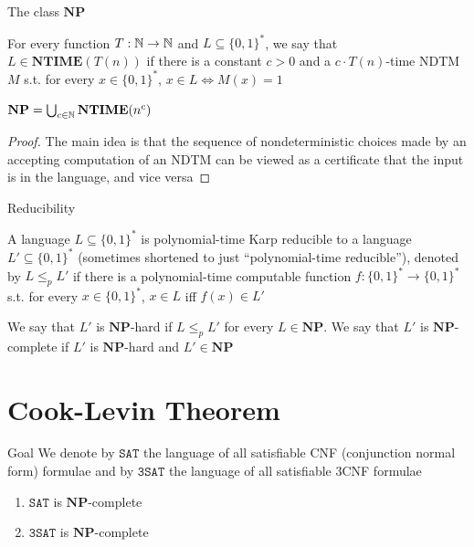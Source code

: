 \documentclass[presentation]{beamer}
\def \NTIME {\textbf{NTIME}}
\def \NP {\textbf{NP}}
\def \NP {\textbf{NP}}
\def \SAT {\texttt{SAT}}
\def \TSAT {\texttt{3SAT}}
\begin{document}
\begin{frame}[label={sec:orgbb9d0bb}]{The class \texorpdfstring{\(\NP\)}{NP}}
\begin{definition}[]
For every function \(T:\mathbb{N}\to\mathbb{N}\) and \(L\subseteq\{0,1\}^*\), we say that \(L\in\NTIME(T(n))\) if there is a
constant \(c>0\) and a \(c\cdot T(n)\)-time NDTM \(M\) s.t. for
every \(x\in\{0,1\}^*\), \(x\in L\Leftrightarrow M(x)=1\)
\end{definition}

\begin{theorem}[]
\(\NP=\bigcup_{c\in\N}\NTIME(n^c)\)
\end{theorem}

\begin{proof}
The main idea is that the sequence of nondeterministic choices made by an accepting computation
of an NDTM  can be viewed as a certificate that the input is in the language, and vice versa
\end{proof}
\end{frame}

\begin{frame}[label={sec:org9508fec}]{Reducibility}
\begin{definition}[]
A language \(L\subseteq\{0,1\}^*\) is \alert{polynomial-time Karp reducible to a
language} \(L'\subseteq\{0,1\}^*\) (sometimes shortened to just ``polynomial-time reducible''), denoted
by \(L\le_p L'\) if there is a polynomial-time
computable function \(f:\{0,1\}^*\to\{0,1\}^*\) s.t. for every \(x\in\{0,1\}^*\),
\(x\in L\) iff \(f(x)\in L'\)

We say that \(L'\) is \alert{\(\NP\)-hard} if \(L\le_pL'\) for every \(L\in\NP\). We say that \(L'\)
is \alert{\(\NP\)-complete} if \(L'\) is \(\NP\)-hard and \(L'\in\NP\)
\end{definition}
\end{frame}
\section{Cook-Levin Theorem}
\label{sec:org48127eb}
\begin{frame}[label={sec:orge03247f}]{Goal}
We denote by \(\SAT\) the language of all satisfiable CNF (conjunction normal form) formulae and by \(\TSAT\) the
language of all satisfiable 3CNF formulae

\begin{theorem}
\begin{enumerate}
\item \(\SAT\) is \(\NP\)-complete
\item \(\TSAT\) is \(\NP\)-complete
\end{enumerate}
\end{theorem}
\end{frame}
\end{document}
